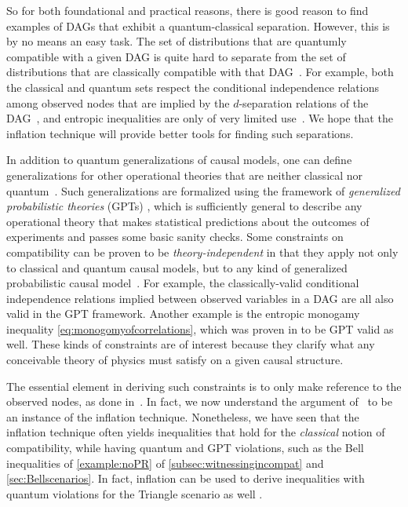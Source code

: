 \documentclass[aps,english,superscriptaddress,onecolumn,twoside,longbibliography,pra,floatfix,fleqn,nofootinbib]{revtex4-1}%
\theoremstyle{definition}
\newcounter{example}[section]
\begin{document}
So for both foundational and practical reasons, there is good reason to find examples of DAGs that exhibit a quantum-classical separation.
However, this is by no means an easy task.
The set of distributions that are quantumly compatible with a given DAG is quite hard to separate from the set of distributions that are classically compatible with that DAG~\cite{pusey2014gdag,fritz2012bell}. For example, both the classical and quantum sets respect the conditional independence relations among observed nodes that are implied by the $d$-separation relations of the DAG~\cite{pusey2014gdag}, and entropic inequalities are only of very limited use~\cite{chaves2012entropic,fritz2012bell}. We hope that the inflation technique will provide better tools for finding such separations.


In addition to quantum generalizations of causal models, one can define generalizations for other operational theories that are neither classical nor quantum~\cite{pusey2014gdag,BeyondBellII}.
Such generalizations are formalized using the framework of {\em generalized probabilistic theories} (GPTs) \cite{Barnum2012GPT,Janotta2014GPT}, which is sufficiently general to describe any operational theory that makes statistical predictions about the outcomes of experiments and passes some basic sanity checks.  Some constraints on compatibility can be proven to be \emph{theory-independent} in that they apply not only to classical and quantum causal models, but to any kind of generalized probabilistic causal model~\cite{pusey2014gdag}. For example, the classically-valid conditional independence relations implied between observed variables in a DAG are all also valid in the GPT framework.
Another example is the entropic monogamy inequality \cref{eq:monogomyofcorrelations}, which was proven in \cite{pusey2014gdag} to be GPT valid as well. These kinds of constraints are of interest because they clarify what any conceivable theory of physics must satisfy on a given causal structure. 

The essential element in deriving such constraints is to only make reference to the observed nodes, as done in~\cite{pusey2014gdag}. In fact, we now understand the argument of~\cite{pusey2014gdag} to be an instance of the inflation technique. Nonetheless, we have seen that the inflation technique often yields inequalities that hold for the {\em classical} notion of compatibility, while having quantum and GPT violations, such as the Bell inequalities of \cref{example:noPR} of \cref{subsec:witnessingincompat} and \cref{sec:Bellscenarios}. In fact, inflation can be used to derive inequalities with quantum violations for the Triangle scenario as well \cite{TC2016trianglequantum}.
\end{document}
